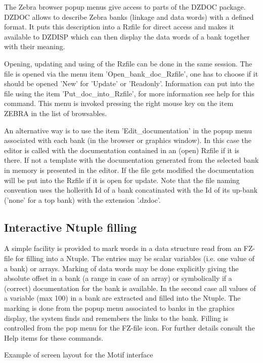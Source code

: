 The Zebra browser popup menus give access to parts of the
DZDOC package. DZDOC allows to describe Zebra banks (linkage
and data words) with a defined format.
It puts this description into a Rzfile for direct access
and makes it available to DZDISP which can then display the
data words of a bank together with their meaning.
 
Opening, updating and using of the Rzfile can be done in the
same session. The file is opened via the menu item
'Open\_bank\_doc\_Rzfile', one has to choose if it should be
opened 'New' for 'Update' or 'Readonly'.
Information can put into the file using the item
'Put\_doc\_into\_Rzfile', for more information see help for this
command. This menu is invoked pressing the right mouse key on 
the item ZEBRA in the list of browsables.
 
An alternative way is to use the item 'Edit\_documentation' in
the popup menu associated with each bank (in the browser or
graphics window). In this case the editor is called with the
documentation contained in an (open) Rzfile if it is there.
If not a template with the documentation generated from the
selected bank in memory is presented in the editor.
If the file gets modified the documentation will be put into
the Rzfile if it is open for update. Note that the file
naming convention uses the hollerith Id of a bank
concatinated with the Id of its up-bank ('none' for a top
bank) with the extension '.dzdoc'.
 
\subsection{Interactive Ntuple filling}
 
A simple facility is provided to mark words in a data structure
read from an FZ-file for filling into a Ntuple. The entries may
be scalar variables (i.e. one value of a bank) or arrays. 
Marking of data words may be done explicitly giving the absolute
offset in a bank (a range in case of an array) or symbolically
if a (correct) documentation for the bank is available. In the
second case all values of a variable (max 100) in a bank are 
extracted and filled into the Ntuple. 
The marking is done from the popup menu associated to banks in
the graphics display, the system finds and remembers the links
to the bank.
Filling is controlled from the pop menu for the FZ-file icon.
For further details consult the Help items for these commands.
 
\begin{Fighere}
  \begin{center}
     \mbox{}
     \vspace{-1.5cm}
    \caption{Example of screen layout for the Motif interface}
    \label{fig:DZDOCFIG6}
  \end{center}
\end{Fighere}
 
